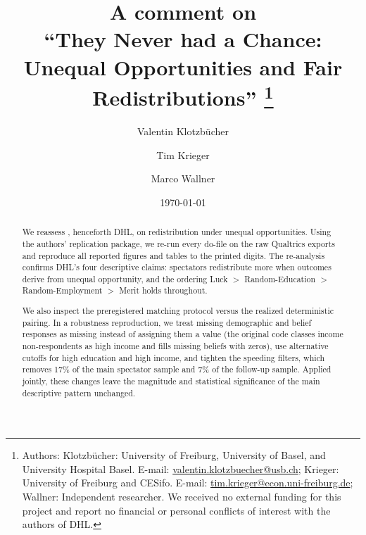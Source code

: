 \documentclass[12pt,a4paper]{article}
\begin{document}
\date{\today}

\title{
\textbf{A comment on } \\[0.25cm]
\textbf{``They Never had a Chance: Unequal Opportunities and Fair Redistributions''}%
%
 \thanks{
Authors: Klotzbücher: University of Freiburg, University of Basel, and University Hospital Basel. E-mail: \href{mailto:valentin.klotzbuecher@usb.ch}{valentin.klotzbuecher@usb.ch};
 Krieger: University of Freiburg and CESifo. E-mail: \href{mailto:tim.krieger@econ.uni-freiburg.de}{tim.krieger@econ.uni-freiburg.de};
Wallner: Independent researcher. We received no external funding for this project and report no financial or personal conflicts of interest with the authors of DHL.
}
}
\author{Valentin Klotzbücher \and Tim Krieger \and Marco Wallner}

\maketitle

\renewcommand{\abstractname}{Abstract}
\begin{abstract}

\small{

We reassess \citet{dong2025}, henceforth DHL, on redistribution under unequal opportunities. Using the authors' replication package, we re-run every do-file on the raw Qualtrics exports and reproduce all reported figures and tables to the printed digits. The re-analysis confirms DHL's four descriptive claims: spectators redistribute more when outcomes derive from unequal opportunity, and the ordering Luck $>$ Random-Education $>$ Random-Employment $>$ Merit holds throughout.

We also inspect the preregistered matching protocol versus the realized deterministic pairing. In a robustness reproduction, we treat missing demographic and belief responses as missing instead of assigning them a value (the original code classes income non-respondents as high income and fills missing beliefs with zeros), use alternative cutoffs for high education and high income, and tighten the speeding filters, which removes 17\% of the main spectator sample and 7\% of the follow-up sample. Applied jointly, these changes leave the magnitude and statistical significance of the main descriptive pattern unchanged.
}\bigskip


\end{abstract}
\end{document}
